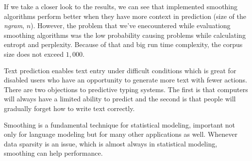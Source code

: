 \documentclass[10pt, a4paper]{article}
\begin{document}
If we take a closer look to the results, we can see that implemented smoothing algorithms perform better when they have more context in prediction (size of the \textit{ngram}, $n$). However, the problem that we\rq{}ve enecountered while evaluationg smoothing algorithms was the low probability causing problems while calculating entropt and perplexity. Because of that and big run time complexity, the corpus size does not exceed $1,000$.

Text prediction enables text entry under difficult conditions which is great for disabled users who have an opportunity to generate more text with fewer actions. There are two objections to predictive typing systems. The first is that computers will always have a limited ability to predict and the second is that people will gradually forget how to write text correctly.

Smoothing is a fundamental technique for statistical modeling, important not only for language modeling but for many other applications as well. Whenever data sparsity is an issue, which is almost always in statistical modeling, smoothing can help performance.

 

\nocite{*}
\end{document}

